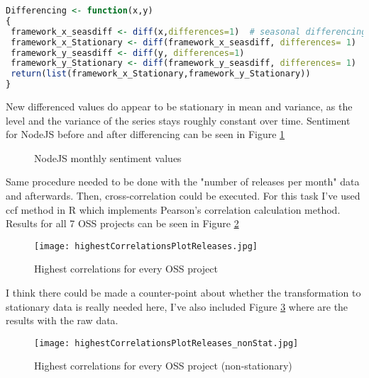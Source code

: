 \begin{lstlisting}[caption={Used differencing method in R},label={lst:differencing},language=R]
Differencing <- function(x,y)
{
 framework_x_seasdiff <- diff(x,differences=1)  # seasonal differencing
 framework_x_Stationary <- diff(framework_x_seasdiff, differences= 1)
 framework_y_seasdiff <- diff(y, differences=1)
 framework_y_Stationary <- diff(framework_y_seasdiff, differences= 1)
 return(list(framework_x_Stationary,framework_y_Stationary))
}
\end{lstlisting}
New differenced values do appear to be stationary in mean and variance, as the level and the variance of the series stays roughly constant over time. Sentiment for NodeJS before and after differencing can be seen in Figure \ref{fig:NodeJS_Sentiment_before_after}

\begin{figure}[H]%
    \centering
    \qquad
    \caption{NodeJS monthly sentiment values}%
    \label{fig:NodeJS_Sentiment_before_after}%
\end{figure}

Same procedure needed to be done with the "number of releases per month" data and afterwards. Then, cross-correlation could be executed. For this task I've used ccf method in R which implements Pearson's correlation calculation method. Results for all 7 OSS projects can be seen in Figure \ref{fig:highestCorrelationsPlotReleases}

\begin{figure}[H]%
    \centering
	\texttt{[image: highestCorrelationsPlotReleases.jpg]}
    \caption{Highest correlations for every OSS project}%
    \label{fig:highestCorrelationsPlotReleases}%
\end{figure}

I think there could be made a counter-point about whether the transformation to stationary data is really needed here, I've also included Figure \ref{fig:highestCorrelationsPlotReleases_nonStat} where are the results with the raw data.

\begin{figure}[H]%
    \centering
	\texttt{[image: highestCorrelationsPlotReleases\_nonStat.jpg]}
    \caption{Highest correlations for every OSS project (non-stationary)}%
    \label{fig:highestCorrelationsPlotReleases_nonStat}%
\end{figure}

